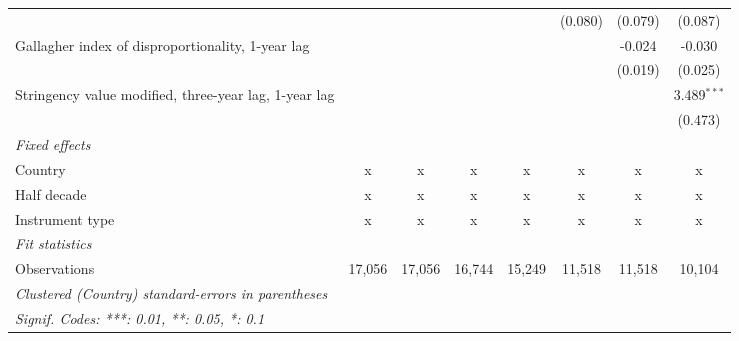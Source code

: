 \begin{table}[htbp]
\begin{tabular}{lccccccc}
                                                            &              &              &              &              & (0.080)       & (0.079)       & (0.087)\\   
      Gallagher index of disproportionality, 1-year lag     &              &              &              &              &               & -0.024        & -0.030\\   
                                                            &              &              &              &              &               & (0.019)       & (0.025)\\   
      Stringency value modified, three-year lag, 1-year lag &              &              &              &              &               &               & 3.489$^{***}$\\   
                                                            &              &              &              &              &               &               & (0.473)\\   
      \emph{Fixed effects}\\
      Country                                               & x            & x            & x            & x            & x             & x             & x\\  
      Half decade                                           & x            & x            & x            & x            & x             & x             & x\\  
      Instrument type                                       & x            & x            & x            & x            & x             & x             & x\\  
      \midrule \emph{Fit statistics}\\
      Observations                                          & 17,056       & 17,056       & 16,744       & 15,249       & 11,518        & 11,518        & 10,104\\  
      \midrule
      \multicolumn{8}{l}{\emph{Clustered (Country) standard-errors in parentheses}}\\
      \multicolumn{8}{l}{\emph{Signif. Codes: ***: 0.01, **: 0.05, *: 0.1}}\\
   \end{tabular}
\end{table}


